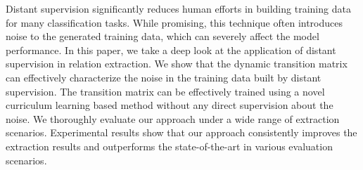 Distant supervision significantly reduces human efforts in building training data for many classification tasks. While promising, this technique often introduces noise to the generated training data, which can severely affect the model performance. In this paper, we take a deep look at the application of distant supervision in relation extraction. We show that the dynamic transition matrix can effectively characterize the noise in the training data built by distant supervision. The transition matrix can be effectively trained using a novel curriculum learning based method without any direct supervision about the noise. We thoroughly evaluate our approach under a wide range of extraction scenarios. Experimental results show that our approach consistently improves the extraction results and outperforms the state-of-the-art in various evaluation scenarios.
